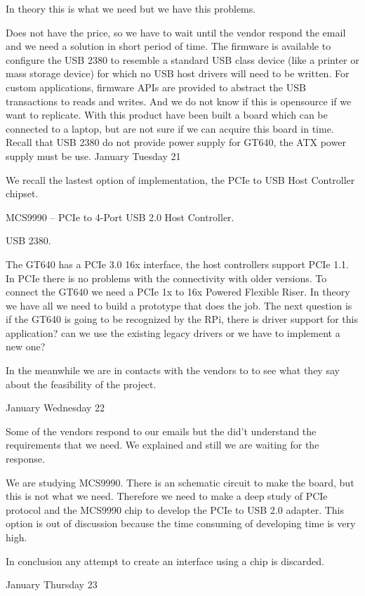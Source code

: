 \documentclass[11pt,twoside]{report}
\begin{document}
In theory this is what we need but we have this problems.

Does not have the price, so we have to wait until the vendor respond the email and we need a solution in short period of time.
The firmware is available to configure the USB 2380 to resemble a standard USB class device (like a printer or mass storage device) for which no USB host drivers will need to be written. For custom applications, firmware APIs are provided to abstract the USB transactions to reads and writes. And we do not know if this is opensource if we want to replicate.
With this product have been built a board which can be connected to a laptop, but are not sure if we can acquire this board in time.
Recall that USB 2380 do not provide power supply for GT640, the ATX power supply must be use.
January Tuesday 21

We recall the lastest option of implementation, the PCIe to USB Host Controller chipset.

MCS9990 – PCIe to 4-Port USB 2.0 Host Controller.

USB 2380.

The GT640 has a PCIe 3.0 16x interface, the host controllers support PCIe 1.1. In PCIe there is no problems with the connectivity with older versions. To connect the GT640 we need a PCIe 1x to 16x Powered Flexible Riser. In theory we have all we need to build a prototype that does the job. The next question is if the GT640 is going to be recognized by the RPi, there is driver support for this application? can we use the existing legacy drivers or we have to implement a new one?

In the meanwhile we are in contacts with the vendors to to see what they say about the feasibility of the project.

January Wednesday 22

Some of the vendors respond to our emails but the did't understand the requirements that we need. We explained and still we are waiting for the response.

We are studying MCS9990. There is an schematic circuit to make the board, but this is not what we need. Therefore we need to make a deep study of PCIe protocol and the MCS9990 chip to develop the PCIe to USB 2.0 adapter. This option is out of discussion because the time consuming of developing time is very high.

In conclusion any attempt to create an interface using a chip is discarded.

January Thursday 23
\end{document}
